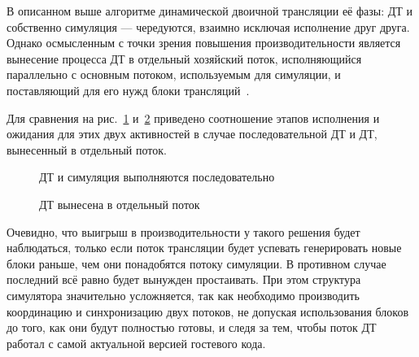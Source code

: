 В описанном выше алгоритме динамической двоичной трансляции её фазы: ДТ и собственно симуляция --- чередуются, взаимно исключая исполнение друг друга. Однако осмысленным с точки зрения повышения производительности является вынесение процесса ДТ в отдельный хозяйский поток, исполняющийся параллельно с основным потоком, используемым для симуляции, и поставляющий для его нужд блоки трансляций~\cite{pqemu2001}.

Для сравнения на рис.~\ref{fig:serial-bt} и~\ref{fig:parallel-bt} приведено соотношение этапов исполнения и ожидания для этих двух активностей в случае последовательной ДТ и ДТ, вынесенный в отдельный поток.

\begin{figure}[htb]
    \centering
{}
    \caption{ДТ и симуляция выполняются последовательно}
    \label{fig:serial-bt}
\end{figure}

\begin{figure}[htb]
    \centering
{}
    \caption{ДТ вынесена в отдельный поток}
    \label{fig:parallel-bt}
\end{figure}

Очевидно, что выигрыш в производительности у такого решения будет наблюдаться, только если поток трансляции будет успевать генерировать новые блоки раньше, чем они понадобятся потоку симуляции. В противном случае последний всё равно будет вынужден простаивать. При этом структура симулятора значительно усложняется, так как необходимо производить координацию и синхронизацию двух потоков, не допуская использования блоков до того, как они будут полностью готовы, и следя за тем, чтобы поток ДТ работал с самой актуальной версией гостевого кода.

